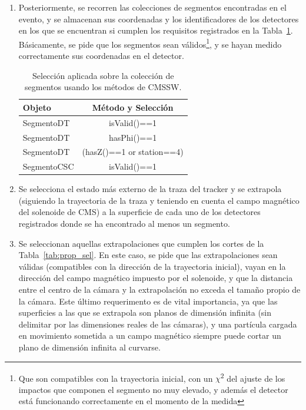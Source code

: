 \begin{enumerate}
\item Posteriormente, se recorren las colecciones de segmentos encontradas en el evento, y se almacenan sus coordenadas y los identificadores de los detectores en los que se encuentran si cumplen los requisitos registrados en la Tabla~\ref{tab:segment_sel}. B\'asicamente, se pide que los segmentos sean v\'alidos\footnote{Que son compatibles con la trayectoria inicial, con un $\chi$\textsuperscript{2} del ajuste de los impactos que componen el segmento no muy elevado, y adem\'as el detector est\'a funcionando correctamente en el momento de la medida}, y se hayan medido correctamente sus coordenadas en el detector.

\begin{table}[htbp]
  \begin{center}
    {\normalsize
      \begin{tabular} {lc}
        \hline
        \hline
        Objeto & M\'etodo y Selecci\'on                    \\
        \hline
        SegmentoDT            & isValid()==1               \\
        SegmentoDT            & hasPhi()==1                \\
        SegmentoDT            & (hasZ()==1 or station==4)  \\
        SegmentoCSC           & isValid()==1               \\
        \hline
      \end{tabular}
    }
    \caption{Selecci\'on aplicada sobre la colecci\'on de segmentos usando los m\'etodos de CMSSW.}
    \label{tab:segment_sel}
  \end{center}
\end{table}


\item Se selecciona el estado m\'as externo de la traza del tracker y se extrapola (siguiendo la trayectoria de la traza y teniendo en cuenta el campo magn\'etico del solenoide de CMS) a la superficie de cada uno de los detectores registrados donde se ha encontrado al menos un segmento.
\item Se seleccionan aquellas extrapolaciones que cumplen los cortes de la Tabla~\ref{tab:prop_sel}. En este caso, se pide que las extrapolaciones sean v\'alidas (compatibles con la direcci\'on de la trayectoria inicial), vayan en la direcci\'on del campo magn\'etico impuesto por el solenoide, y que la distancia entre el centro de la c\'amara y la extrapolaci\'on no exceda el tama\~no propio de la c\'amara. Este \'ultimo requerimento es de vital importancia, ya que las superficies a las que se extrapola son planos de dimensi\'on infinita (sin delimitar por las dimensiones reales de las c\'amaras), y una part\'icula cargada en movimiento sometida a un campo magn\'etico siempre puede cortar un plano de dimensi\'on infinita al curvarse.


\end{enumerate}
